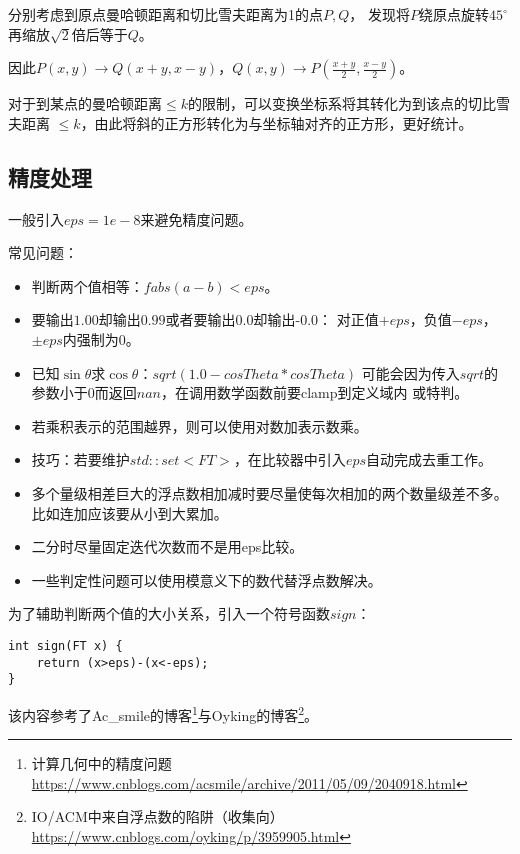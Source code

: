 分别考虑到原点曼哈顿距离和切比雪夫距离为1的点$P,Q$，
发现将$P$绕原点旋转$45^\circ$再缩放$\sqrt{2}$倍后等于$Q$。

因此$P(x,y)\rightarrow Q(x+y,x-y)$，$Q(x,y)
\rightarrow P(\frac{x+y}{2},\frac{x-y}{2})$。

对于到某点的曼哈顿距离$\leq k$的限制，可以变换坐标系将其转化为到该点的切比雪夫距离
$\leq k$，由此将斜的正方形转化为与坐标轴对齐的正方形，更好统计。
\subsection{精度处理}
一般引入$eps=1e-8$来避免精度问题。

常见问题：
\begin{itemize}
    \item 判断两个值相等：$fabs(a-b)<eps$。
    \item 要输出$1.00$却输出$0.99$或者要输出0.0却输出-0.0：
        对正值$+eps$，负值$-eps$，$\pm eps$内强制为0。
    \item 已知$\sin \theta$求$\cos \theta$：$sqrt(1.0-cosTheta*cosTheta)$
    可能会因为传入$sqrt$的参数小于0而返回$nan$，在调用数学函数前要clamp到定义域内
    或特判。
    \item 若乘积表示的范围越界，则可以使用对数加表示数乘。
    \item 技巧：若要维护$std::set<FT>$，在比较器中引入$eps$自动完成去重工作。
    \item 多个量级相差巨大的浮点数相加减时要尽量使每次相加的两个数量级差不多。
    比如连加应该要从小到大累加。
    \item 二分时尽量固定迭代次数而不是用eps比较。
    \item 一些判定性问题可以使用模意义下的数代替浮点数解决。
\end{itemize}

为了辅助判断两个值的大小关系，引入一个符号函数$sign$：
\begin{lstlisting}
int sign(FT x) {
    return (x>eps)-(x<-eps);
}
\end{lstlisting}

该内容参考了Ac\_smile的博客\footnote{计算几何中的精度问题\\
    \url{https://www.cnblogs.com/acsmile/archive/2011/05/09/2040918.html}
}与Oyking的博客\footnote{
    IO/ACM中来自浮点数的陷阱（收集向）
    \url{https://www.cnblogs.com/oyking/p/3959905.html}
}。
